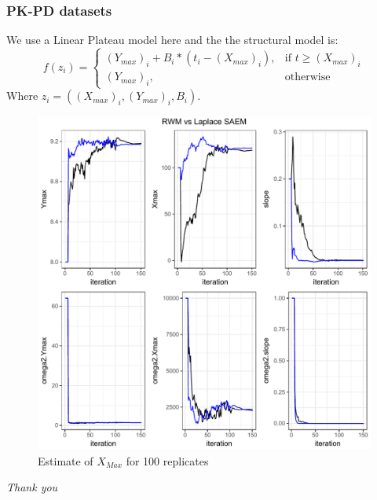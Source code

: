 \documentclass[xcolor={dvipsnames}]{beamer}
\begin{document}
\begin{frame}
\frametitle{PK-PD datasets}

We use a Linear Plateau model here and the the structural model is:
\begin{equation}
    f(z_i)= 
\begin{cases}
    (Y_{max})_i + B_i*(t_i-(X_{max})_i) ,& \text{if } t\geq (X_{max})_i\\
    (Y_{max})_i,              & \text{otherwise}
\end{cases}
\end{equation}
Where $z_i=((X_{max})_i,(Y_{max})_i,B_i)$.


\begin{figure}[h]
\begin{center}
\includegraphics[scale=0.3]{map.pdf}
\end{center}
\caption{Estimate of $X_{Max}$ for 100 replicates}
\end{figure}

\end{frame}



\begin{frame}{}
  \centering \Large
  \emph{Thank you}
\end{frame}
\end{document}
